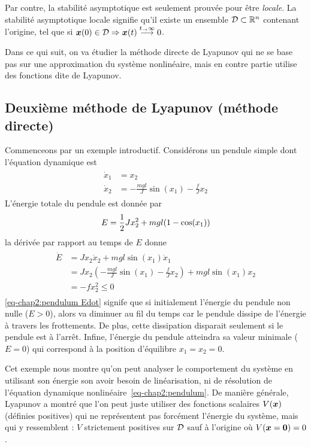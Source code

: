 Par contre, la stabilité asymptotique est seulement prouvée pour être \emph{locale}. 
La stabilité asymptotique locale signifie qu'il existe un ensemble ${\cal D}\subset\mathbb{R}^n$ contenant l'origine, tel que si $\bm{x}(0)\in{\cal D}\Rightarrow \bm{x}(t)\overset{t_\rightarrow\infty}{\longrightarrow}0$. 

Dans ce qui suit, on va étudier la méthode directe de Lyapunov qui ne se base pas sur une approximation du système nonlinéaire, mais en contre partie utilise des fonctions dite de Lyapunov. 
\subsection{Deuxième méthode de Lyapunov (méthode directe)}
Commenceons par un exemple introductif. Considérons un pendule simple dont l'équation dynamique est 
\begin{align}\label{eq-chap2:pendulum}
	\begin{split}
		\dot{x}_1 &= x_2 \\
		\dot{x}_2 &= -\frac{mgl}{J}\sin(x_1)-\frac{f}{J}x_2
	\end{split}
\end{align}
L'énergie totale du pendule est donnée par 
\begin{equation}
	E = \frac{1}{2} Jx_2^2+mgl(1-\cos(x_1))
\end{equation}
la dérivée par rapport au temps de $E$ donne
\begin{align}\label{eq-chap2:pendulum Edot}
	\begin{split}
		\dot{E}&=Jx_2\dot{x}_2+mgl\sin(x_1)\dot{x}_1\\
		 	   &= Jx_2\left(-\frac{mgl}{J}\sin(x_1)-\frac{f}{J}x_2\right) + mgl\sin(x_1)x_2\\
		 	   &=-fx_2^2 \leq0
	\end{split}
\end{align} 
\cref{eq-chap2:pendulum Edot} signife que si initialement l'énergie du pendule non nulle ($E>0$), alors va diminuer au fil du temps car le pendule dissipe de l'énergie à travers les frottements. De plus, cette dissipation disparait seulement si le pendule est à l'arrêt. Infine, l'énergie du pendule atteindra sa valeur minimale ($E=0$) qui correspond à la position d'équilibre $x_1=x_2=0$. 

Cet exemple nous montre qu'on peut analyser le comportement du système en utilisant son énergie son avoir besoin de linéarisation, ni de résolution de l'équation dynamique nonlinéaire~\eqref{eq-chap2:pendulum}. De manière générale, Lyapunov a montré que l'on peut juste utiliser des fonctions scalaires $V(\bm{x})$ (définies positives) qui ne représentent pas forcément l'énergie du système, mais qui y ressemblent : $V$  strictement positives sur ${\cal D}$ sauf à l'origine où $V(\bm{x}=\mathbf{0})=0$. 

